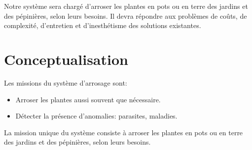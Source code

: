 
\samir
{
Notre système sera chargé d'arroser les plantes en pots ou en terre des jardins et des pépinières, selon leurs besoins. Il devra répondre aux problèmes de coûts, de complexité, d'entretien et d'inesthétisme des solutions existantes.
}

\section{Conceptualisation}
Les missions du système d'arrosage sont:
\begin{itemize}
\item Arroser les plantes aussi souvent que nécessaire.
\item Détecter la présence d'anomalies: parasites, maladies.
\end{itemize}


\samir
{
La mission unique du système consiste à arroser les plantes en pots ou en terre des jardins et des pépinières, selon leurs besoins.
}


